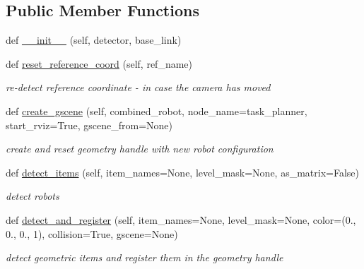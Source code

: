 \subsection*{Public Member Functions}
\begin{DoxyCompactItemize}
\item 
def \hyperlink{classrnb-planning_1_1src_1_1pkg_1_1geometry_1_1builder_1_1scene__builder_1_1_scene_builder_ad8161871a56a8603880ff793de656f54}{\+\_\+\+\_\+init\+\_\+\+\_\+} (self, detector, base\+\_\+link)
\item 
def \hyperlink{classrnb-planning_1_1src_1_1pkg_1_1geometry_1_1builder_1_1scene__builder_1_1_scene_builder_a2c34d82f4be323f96330d7b93911b4b4}{reset\+\_\+reference\+\_\+coord} (self, ref\+\_\+name)
\begin{DoxyCompactList}\small\item\em re-\/detect reference coordinate -\/ in case the camera has moved \end{DoxyCompactList}\item 
def \hyperlink{classrnb-planning_1_1src_1_1pkg_1_1geometry_1_1builder_1_1scene__builder_1_1_scene_builder_aea9619cd51480a5c564ab417a376a158}{create\+\_\+gscene} (self, combined\+\_\+robot, node\+\_\+name=\textquotesingle{}task\+\_\+planner\textquotesingle{}, start\+\_\+rviz=True, gscene\+\_\+from=None)
\begin{DoxyCompactList}\small\item\em create and reset geometry handle with new robot configuration \end{DoxyCompactList}\item 
def \hyperlink{classrnb-planning_1_1src_1_1pkg_1_1geometry_1_1builder_1_1scene__builder_1_1_scene_builder_a291c8ecf3ad8b75ca296e722f3381d98}{detect\+\_\+items} (self, item\+\_\+names=None, level\+\_\+mask=None, as\+\_\+matrix=False)
\begin{DoxyCompactList}\small\item\em detect robots \end{DoxyCompactList}\item 
def \hyperlink{classrnb-planning_1_1src_1_1pkg_1_1geometry_1_1builder_1_1scene__builder_1_1_scene_builder_aa3fccf12b04d62e5d64c3abffc754971}{detect\+\_\+and\+\_\+register} (self, item\+\_\+names=None, level\+\_\+mask=None, color=(0., 0., 0., 1), collision=True, gscene=None)
\begin{DoxyCompactList}\small\item\em detect geometric items and register them in the geometry handle \end{DoxyCompactList}\item 

\end{DoxyCompactItemize}
